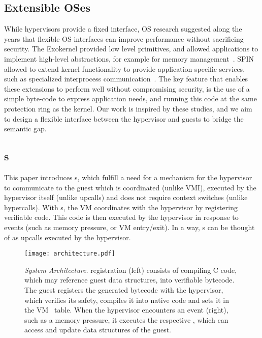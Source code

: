 \documentclass[11pt]{article}
\begin{document}
\subsection{Extensible OSes}
While hypervisors provide a fixed interface, OS research suggested along the years
that flexible OS interfaces can improve performance without sacrificing security. The Exokernel
provided low level primitives, and allowed applications to implement high-level abstractions,
for example for memory management~\cite{engler1995exokernel}. SPIN allowed to extend kernel
functionality to provide application-specific services, such as specialized interprocess
communication~\cite{bershad1995extensibility}. The key feature that enables these extensions
to perform well without compromising security, is the use of a simple byte-code to express
application needs, and running this code at the same protection ring as the kernel.
Our work is inspired by these studies, and we aim to design a flexible interface between the hypervisor
and guests to bridge the semantic gap.

\subsection{\Hypercallback{}s}

This paper introduces \hypercallback{}s, which fulfill a need for a mechanism
for the hypervisor to communicate to the guest which is coordinated (unlike VMI),
executed by the hypervisor itself (unlike upcalls) and does not require context switches (unlike hypercalls).
With \hypercallback{}s, the VM coordinates with the hypervisor by registering verifiable code. 
This code is then executed by the hypervisor in response to events (such as memory pressure, or VM entry/exit). In
a way, \hypercallback{}s can be thought of as upcalls executed by the hypervisor.

\begin{figure}[t!]
	\centering
	\texttt{[image: architecture.pdf]}
	\caption{\emph{System Architecture.} \Hypercallback{} registration (left) consists of 
	compiling C code, which may reference guest data structures, into verifiable bytecode. 
	The guest registers the generated bytecode with the hypervisor, which verifies its safety, 
	compiles it into native code and sets it in the VM \hypercallback~table. When the 
	hypervisor encounters an event (right), such as a memory pressure, it executes the respective 
	\hypercallback, which can access and update data structures of the guest.}
	\label{fig:system_overview}
    \end{figure}
    
\end{document}
